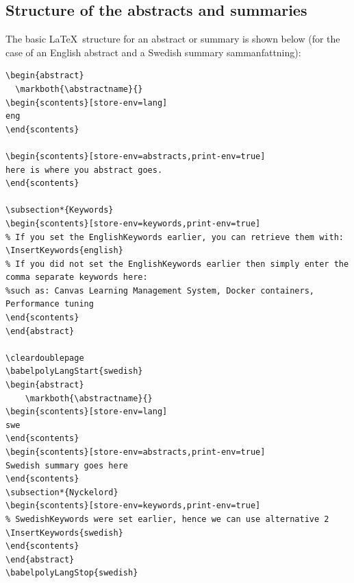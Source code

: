 \documentclass[main.tex]{subfiles}
\begin{document}
\subsection{Structure of the abstracts and summaries}
The basic \LaTeX\  structure for an abstract or summary is shown below (for the case of an English abstract and a Swedish summary \ie sammanfattning):
\begin{lstlisting}[style=latexExampleForAuthors]
\begin{abstract}
  \markboth{\abstractname}{}
\begin{scontents}[store-env=lang]
eng
\end{scontents}

\begin{scontents}[store-env=abstracts,print-env=true]
here is where you abstract goes.
\end{scontents}

\subsection*{Keywords}
\begin{scontents}[store-env=keywords,print-env=true]
% If you set the EnglishKeywords earlier, you can retrieve them with:
\InsertKeywords{english}
% If you did not set the EnglishKeywords earlier then simply enter the comma separate keywords here:
%such as: Canvas Learning Management System, Docker containers, Performance tuning
\end{scontents}
\end{abstract}

\cleardoublepage
\babelpolyLangStart{swedish}
\begin{abstract}
    \markboth{\abstractname}{}
\begin{scontents}[store-env=lang]
swe
\end{scontents}
\begin{scontents}[store-env=abstracts,print-env=true]
Swedish summary goes here
\end{scontents}
\subsection*{Nyckelord}
\begin{scontents}[store-env=keywords,print-env=true]
% SwedishKeywords were set earlier, hence we can use alternative 2
\InsertKeywords{swedish}
\end{scontents}
\end{abstract}
\babelpolyLangStop{swedish}
\end{lstlisting}
\end{document}
